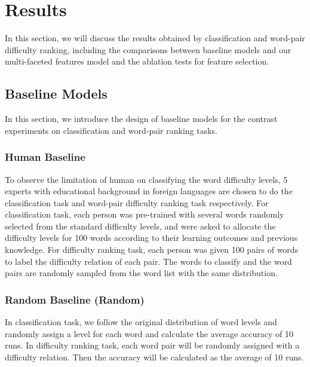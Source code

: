\section{Results}
\label{sec:res}
In this section, we will discuss the results obtained by classification and word-pair difficulty ranking, 
including the comparisons between baseline models and our multi-faceted features model and the ablation tests for feature selection.

\subsection{Baseline Models}
In this section, we introduce the design of baseline models for the contrast experiments on classification and word-pair ranking tasks.
\subsubsection{Human Baseline}
To observe the limitation of human on classifying the word difficulty levels, 5 experts with educational background in foreign languages are chosen to do the classification task and word-pair difficulty ranking task respectively.
For classification task, each person was pre-trained with several words randomly selected from the standard difficulty levels, and were asked to allocate the difficulty levels for  100 words according to their learning outcomes and previous knowledge.
For difficulty ranking task, each person was given 100 pairs of words to label the difficulty relation of each pair. 
The words to classify and the word pairs are randomly sampled from the word list with the same distribution.

\subsubsection{Random Baseline (Random)}
In classification task, we follow the original distribution of word levels and randomly assign a level for each word and calculate the average accuracy of 10 runs.
In difficulty ranking task, 
each word pair will be randomly assigned with a difficulty relation.
Then the accuracy will be calculated as the average of 10 runs.

